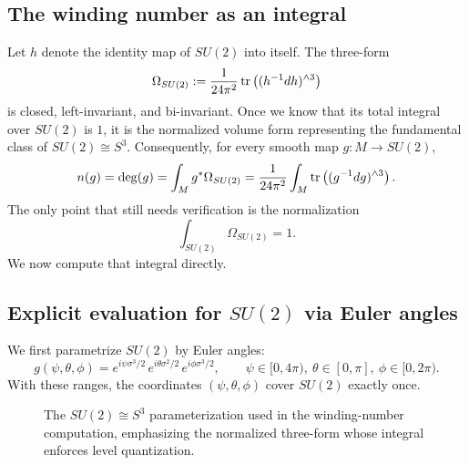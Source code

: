 \subsection{The winding number as an integral}

Let $h$ denote the identity map of $SU(2)$ into itself. The three-form
\begin{equation}\label{eq:su2-volume-form}
\Omega_{SU(2)} := \frac{1}{24\pi^2}\operatorname{tr}\left((h^{-1}dh)^{\wedge 3}\right)
\end{equation}
is closed, left-invariant, and bi-invariant. Once we know that its total integral over $SU(2)$ is $1$, it is the normalized volume form representing the fundamental class of $SU(2)\cong S^3$. Consequently, for every smooth map $g:M\to SU(2)$,
\begin{equation}\label{eq:winding-integral}
n(g) = \deg(g) = \int_M g^*\Omega_{SU(2)} = \frac{1}{24\pi^2}\int_M \operatorname{tr}\left((g^{-1}dg)^{\wedge 3}\right).
\end{equation}
The only point that still needs verification is the normalization
\begin{equation*}
\int_{SU(2)}\Omega_{SU(2)} = 1.
\end{equation*}
We now compute that integral directly.

\subsection{Explicit evaluation for $SU(2)$ via Euler angles}\label{subsec:Euler}

We first parametrize $SU(2)$ by Euler angles:
\begin{equation}\label{eq:Euler}
g(\psi,\theta,\phi) = e^{i\psi \sigma^3/2}\, e^{i\theta \sigma^2/2}\, e^{i\phi \sigma^3/2},
\qquad
\psi\in [0,4\pi),\ \theta\in[0,\pi],\ \phi\in[0,2\pi).
\end{equation}
With these ranges, the coordinates $(\psi,\theta,\phi)$ cover $SU(2)$ exactly once.

\begin{figure}[h]
    \centering
    
    \caption{The $SU(2)\cong S^3$ parameterization used in the winding-number computation, emphasizing the normalized three-form whose integral enforces level quantization.}
    \label{fig:su2-winding}
\end{figure}

\medskip


